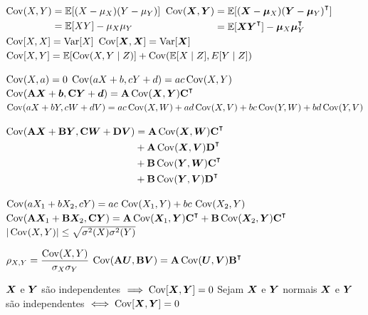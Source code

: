 \begin{theorem}
	\leavevmode
	\begin{outline}[enumerate]
		\1 \( 
		\begin{aligned}[t]
			\operatorname{Cov}(X,Y) &= \operatorname{\mathbb{E}}[(X-\mu_X)(Y-\mu_Y)] \\
			&= \operatorname{\mathbb{E}}[XY] - \mu_X\mu_Y
		\end{aligned} \)
		\1 \(
		\begin{aligned}[t]
			\Cov(\v{X}, \v{Y}) &= \E[(\v{X} - \v{\mu}_X)(\v{Y} - \v{\mu}_Y)\T ]\\
			&= \E[\v{X}\v{Y}\T] - \v{\mu}_X\v{\mu}_Y\T
		\end{aligned} \)
		\1 \( \operatorname{Cov}[X,X] = \operatorname{Var}[X] \)
		\1 \( \operatorname{Cov}[\bm{X},\bm{X}] = \operatorname{Var}[\bm{X}] \)
		\1 \( \operatorname{Cov}[X,Y] = \operatorname{\mathbb{E}}[ \operatorname{Cov}(X,Y \mid Z)] +\operatorname{Cov}( \operatorname{\mathbb{E}}[X\mid Z],E[Y\mid Z]) \)
		
		\1 \( \operatorname{Cov}(X, a) = 0 \)
		\1 \(\operatorname{Cov}(aX+b, cY+d) = ac\operatorname{Cov}(X, Y)\ \)
		\1 \(\Cov(\m{A}\v{X}+\v{b}, \m{C}\v{Y}+\v{d}) = \m{A}\Cov(\v{X}, \v{Y})\m{C}\T \)
		\1 \( \operatorname{Cov}(aX + bY, cW + dV) = ac\operatorname{Cov}(X, W) + ad\operatorname{Cov}(X, V) + bc\operatorname{Cov}(Y, W) + bd\operatorname{Cov}(Y, V) \)
		
		\1 \( \begin{aligned}[t] 
			\Cov(\m{A}\v{X}+ \m{B}\v{Y}, \m{C}\v{W} + \m{D}\v{V}) 
			&= \m{A}\Cov(\v{X}, \v{W})\m{C}\T \\
			&+ \m{A}\Cov(\v{X}, \v{V})\m{D}\T \\
			&+ \m{B}\Cov(\v{Y}, \v{W})\m{C}\T \\
			&+ \m{B}\Cov(\v{Y}, \v{V})\m{D}\T
		\end{aligned}\)
		
		\1 \( \operatorname{Cov}(aX_1 + bX_2, cY) = ac\,\operatorname{Cov}(X_1, Y) + bc\,\operatorname{Cov}(X_2, Y) \)
		\1 \( \Cov(\m{A}\v{X}_1 + \m{B}\v{X}_2, \m{C}\v{Y}) = \m{A}\Cov(\v{X}_1, \v{Y})\m{C}\T + \m{B}\Cov(\v{X}_2, \v{Y})\m{C}\T \)
		\1 \(|\operatorname{Cov}(X, Y)| \leq \sqrt{\sigma^2(X)\sigma^2(Y)}\)
		
		\1 \(\displaystyle \rho_{X,Y} = \frac{\operatorname{Cov}(X, Y)}{\sigma_X \sigma_Y} \)
		\1 \( \Cov(\m{A}\v{U}, \m{B}\v{V}) = \m{A}\Cov(\v{U}, \v{V})\m{B}\T \)
		
	\end{outline}
\end{theorem}

\begin{theorem}
	\leavevmode
	\begin{outline}[enumerate]
		\1 $\bm{X}$ e $\bm{Y}$ são independentes $\implies \operatorname{Cov}[\bm{X}, \bm{Y}]=0$
		\1 Sejam $\bm{X}$ e $\bm{Y}$ normais 
			\2 $\bm{X}$ e $\bm{Y}$ são independentes $\iff \operatorname{Cov}[\bm{X}, \bm{Y}]=0$  
	\end{outline}
\end{theorem}


